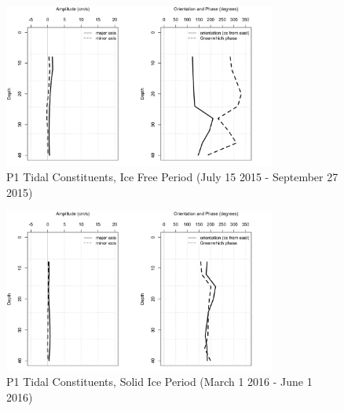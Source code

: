 \documentclass[12pt]{dforeport}
\begin{document}
\begin{figure}  
\centering
\includegraphics[width = 0.8\textwidth]{./figures/61_P1TC_if_2015.png}
\caption[P1 Tidal Constituents, Ice free, 2015]{P1 Tidal Constituents, Ice Free Period (July 15 2015 - September 27 2015)}
\label{f:p1_if_2015}
\end{figure}

\begin{figure}  
\centering
\includegraphics[width = 0.8\textwidth]{./figures/62_P1TC_si_2015.png}
\caption[P1 Tidal Constituents, Solid Ice, 2015]{P1 Tidal Constituents, Solid Ice Period (March 1 2016 - June 1 2016)}
\label{f:p1_si_2015}
\end{figure}
\end{document}
